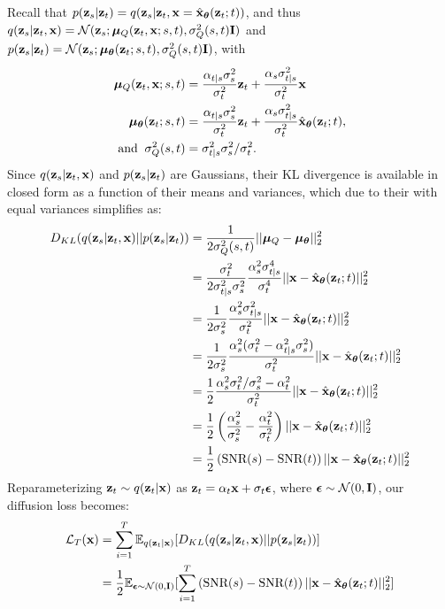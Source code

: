 \documentclass{article}
\newcommand{\snr}{\text{SNR}}
\begin{document}
Recall that $p({\mathbf{z}}_s|{\mathbf{z}}_t) = q({\mathbf{z}}_s|{\mathbf{z}}_t, {\mathbf{x}}=\hat{{\mathbf{x}}}_{{\boldsymbol{\theta}}}({\mathbf{z}}_t; t))$, and thus $q({\mathbf{z}}_s|{\mathbf{z}}_t,{\mathbf{x}}) = \mathcal{N}({\mathbf{z}}_s; {\boldsymbol{\mu}}_{Q}({\mathbf{z}}_{t}, {\mathbf{x}}; s,t), \sigma^2_Q(s,t) \mathbf{I})$ and $p({\mathbf{z}}_s|{\mathbf{z}}_t) = \mathcal{N}({\mathbf{z}}_s; {\boldsymbol{\mu}}_{{\boldsymbol{\theta}}}({\mathbf{z}}_{t}; s, t), \sigma^2_Q(s,t) \mathbf{I})$, with
\begin{align}
{\boldsymbol{\mu}}_{Q}({\mathbf{z}}_t, {\mathbf{x}}; s, t) &= \frac{\alpha_{t|s}\sigma^{2}_s}{\sigma^{2}_t}{\mathbf{z}}_{t} + \frac{\alpha_s \sigma^{2}_{t|s}}{\sigma^{2}_{t}}{\mathbf{x}}\\
{\boldsymbol{\mu}}_{{\boldsymbol{\theta}}}({\mathbf{z}}_t; s, t) &= \frac{\alpha_{t|s}\sigma^{2}_s}{\sigma^{2}_t}{\mathbf{z}}_{t} + \frac{\alpha_s \sigma^{2}_{t|s}}{\sigma^{2}_{t}}\hat{{\mathbf{x}}}_{{\boldsymbol{\theta}}}({\mathbf{z}}_t; t),\\
\text{and\;\;} \sigma^2_Q(s,t) &= \sigma^2_{t|s}\sigma^2_s / \sigma^2_t.
\end{align}
Since $q({\mathbf{z}}_s|{\mathbf{z}}_t,{\mathbf{x}})$ and $p({\mathbf{z}}_s|{\mathbf{z}}_t)$ are Gaussians, their KL divergence is available in closed form as a function of their means and variances, which due to their with equal variances simplifies as:
\begin{align}
D_{KL}(q(\rvz_s|\rvz_t,\rvx)||p(\rvz_s|\rvz_t)) 
&= \frac{1}{2\sigma^2_Q(s,t)}
||\bmu_Q - \bmu_\bT||_2^2
\label{eq:KL_DPM}
\\
&= 
\frac{\sigma^2_t}{2\sigma^2_{t|s}\sigma^2_s}
\frac{\alpha_s^{2} \sigma^{4}_{t|s}}{\sigma^{4}_{t}}
||\rvx - \hat{\rvx}_{\bT}(\rvz_t; t)||_2^2\\
&= 
\frac{1}{2\sigma^2_s}
\frac{\alpha_s^{2} \sigma^{2}_{t|s}}{\sigma^{2}_{t}}
||\rvx - \hat{\rvx}_{\bT}(\rvz_t; t)||_2^2\\
&= 
\frac{1}{2\sigma^2_s}
\frac{\alpha_s^{2}(\sigma^{2}_t - \alpha_{t|s}^{2}\sigma^{2}_s)}{\sigma^{2}_{t}}
||\rvx - \hat{\rvx}_{\bT}(\rvz_t; t)||_2^2\\
&= 
\frac{1}{2}
\frac{\alpha_s^{2}\sigma^{2}_t/\sigma^2_s - \alpha_{t}^{2}}{\sigma^{2}_{t}}
||\rvx - \hat{\rvx}_{\bT}(\rvz_t; t)||_2^2\\
&= 
\frac{1}{2}\left(
\frac{\alpha_s^{2}}{\sigma^2_s} - \frac{\alpha_t^{2}}{\sigma^{2}_t}\right)
||\rvx - \hat{\rvx}_{\bT}(\rvz_t; t)||_2^2\\
&= 
\frac{1}{2}\left(
\snr(s) - \snr(t)\right)
||\rvx - \hat{\rvx}_{\bT}(\rvz_t; t)||_2^2
\end{align}
Reparameterizing ${\mathbf{z}}_t \sim q({\mathbf{z}}_t|{\mathbf{x}})$ as ${\mathbf{z}}_t = \alpha_t {\mathbf{x}} + \sigma_t {\boldsymbol{\epsilon}}$, where ${\boldsymbol{\epsilon}} \sim \mathcal{N}(0,\mathbf{I})$, our diffusion loss becomes:
\begin{align}
\mathcal{L}_T(\rvx) &= \sum_{i=1}^T \E_{q(\rvz_t|\rvx)}[ D_{KL}(q(\rvz_s|\rvz_t,\rvx)||p(\rvz_s|\rvz_t))]\\
&= \frac{1}{2}\E_{\bepsilon \sim \mathcal{N}(0,\bfI)}[\sum_{i=1}^T
\left(
\snr(s) - \snr(t)\right)
||\rvx - \hat{\rvx}_{\bT}(\rvz_t; t)||_2^2]
\end{align}
\end{document}
